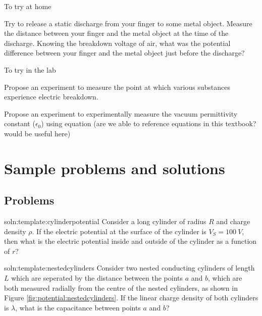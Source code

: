 \begin{chapteractivity}{To try at home}
{
\item Try to release a static discharge from your finger to some metal object. Measure the distance between your finger and the metal object at the time of the discharge. Knowing the breakdown voltage of air, what was the potential difference between your finger and the metal object just before the discharge?
}
\end{chapteractivity}

\begin{chapteractivity}{To try in the lab}
{
\item Propose an experiment to measure the point at which various substances experience electric breakdown.
\item Propose an experiment to experimentally measure the vacuum permittivity constant ($\epsilon_0$) using equation (are we able to reference equations in this textbook? would be useful here)
}
\end{chapteractivity}

\newpage
\section{Sample problems and solutions}

\subsection{Problems}
\begin{problem}{soln:template:cylinderpotential}{\label{prob:template:cylinderpotential} 
Consider a long cylinder of radius $R$ and charge density $\rho$. If the electric potential at the surface of the cylinder is $V_S = \SI{100}{V}$, then what is the electric potential inside and outside of the cylinder as a function of $r$?}

\end{problem}

\begin{problem}{soln:template:nestedcylinders}{\label{prob:template:nestedcylinders} 
		Consider two nested conducting cylinders of length $L$ which are seperated by the distance between the points $a$ and $b$, which are both measured radially from the centre of the nested cylinders, as shown in Figure \ref{fig:potential:nestedcylinders}. If the linear charge density of both cylinders is $\lambda$, what is the capacitance between points $a$ and $b$?}
	
	
\end{problem}
\newpage
